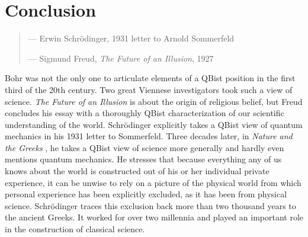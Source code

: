 \documentclass[aps,prb,superscriptaddress,12pt,tightenlines,nofootinbib]{revtex4-2}
\begin{document}
\section{Conclusion}

\begin{quote}

\hskip 10pt --- Erwin Schr\"odinger, 1931 letter to Arnold Sommerfeld\cite{Schroedinger1931}


\vskip  12pt


\hskip 10pt    --- Sigmund Freud,   {\it The Future of an Illusion}, 1927\cite{Freud1927}

\end{quote}


Bohr was not the only one to articulate elements of a QBist position in the first third of the 20th century.  Two great Viennese investigators took such a  view of science.  {\it The Future of an Illusion}   is about the origin of religious belief, but Freud concludes his essay with a thoroughly QBist characterization of our scientific understanding of the world.   Schr\"odinger explicitly takes a QBist view of quantum mechanics in his 1931 letter to Sommerfeld.   Three decades later,  in {\it Nature and the Greeks} \cite{Schroedinger1951}, he takes a  QBist view of science more generally and hardly even mentions quantum mechanics.   He stresses that because everything any of us knows about the world is constructed out of his or her individual private experience,  it can be unwise to rely on a picture of the physical world from which personal experience has been explicitly excluded, as it has been from  physical science.  Schr\"odinger traces this exclusion back more than two thousand years to the ancient Greeks.  It worked for over two millennia and played an important role in the construction of classical science.
\end{document}
